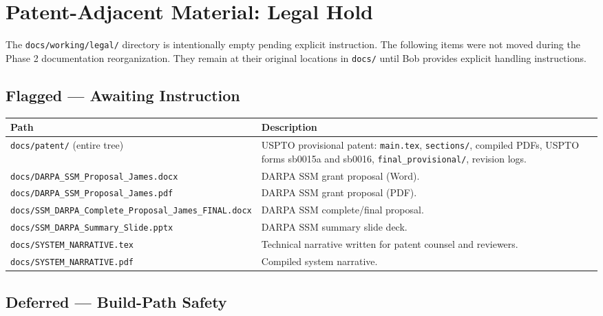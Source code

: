 
\section{Patent-Adjacent Material: Legal Hold}

The \texttt{docs/working/legal/} directory is intentionally empty pending
explicit instruction. The following items were not moved during the Phase 2
documentation reorganization. They remain at their original locations in
\texttt{docs/} until Bob provides explicit handling instructions.

\subsection{Flagged — Awaiting Instruction}

\begin{center}
\begin{tabular}{lp{8cm}}
\toprule
Path & Description \\
\midrule
\texttt{docs/patent/} (entire tree) & USPTO provisional patent: \texttt{main.tex}, \texttt{sections/}, compiled PDFs, USPTO forms sb0015a and sb0016, \texttt{final\_provisional/}, revision logs. \\
\texttt{docs/DARPA\_SSM\_Proposal\_James.docx} & DARPA SSM grant proposal (Word). \\
\texttt{docs/DARPA\_SSM\_Proposal\_James.pdf} & DARPA SSM grant proposal (PDF). \\
\texttt{docs/SSM\_DARPA\_Complete\_Proposal\_James\_FINAL.docx} & DARPA SSM complete/final proposal. \\
\texttt{docs/SSM\_DARPA\_Summary\_Slide.pptx} & DARPA SSM summary slide deck. \\
\texttt{docs/SYSTEM\_NARRATIVE.tex} & Technical narrative written for patent counsel and reviewers. \\
\texttt{docs/SYSTEM\_NARRATIVE.pdf} & Compiled system narrative. \\
\bottomrule
\end{tabular}
\end{center}

\subsection{Deferred — Build-Path Safety}

